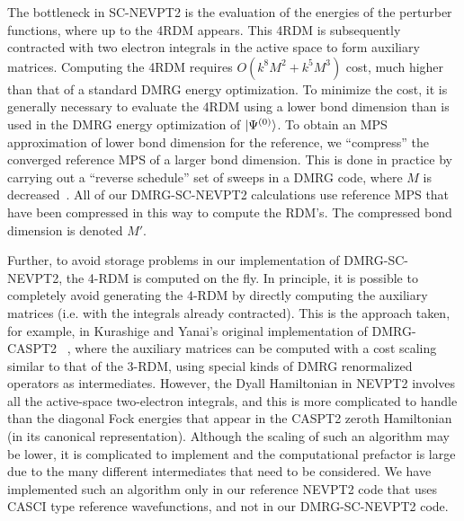 The bottleneck in SC-NEVPT2 is the evaluation of the energies of the perturber functions, 
where up to the 4RDM appears. This 4RDM is subsequently contracted with 
two electron integrals in the active space to form auxiliary matrices.\cite{ angeli_n-electron_2002} 
Computing the 4RDM requires $O(k^8M^2+k^5M^3)$ cost, much higher than that of a standard DMRG energy optimization.
To minimize the cost, it is generally necessary to evaluate the 4RDM using a lower bond dimension than is used in the DMRG energy optimization of $\ket{\Psi^{(0)}}$.
To obtain an MPS approximation of lower bond dimension for the reference, 
we  ``compress'' the converged reference MPS of a larger bond dimension.
 This is done in practice by carrying out a ``reverse schedule'' set of sweeps
in a DMRG code, where $M$ is decreased~\cite{olivares-amaya_ab-initio_2015}. All of our DMRG-SC-NEVPT2 calculations use reference MPS that have been 
compressed in this way to compute the RDM's. The compressed bond dimension is
denoted $M'$.

Further, to avoid storage problems in our implementation of DMRG-SC-NEVPT2, 
the 4-RDM is computed on the fly. In principle, it is possible to 
completely avoid generating the 4-RDM by directly computing the auxiliary matrices (i.e. with the integrals already contracted). 
This is the approach taken, for example, in Kurashige and Yanai's original implementation of DMRG-CASPT2
~\cite{kurashige_second-order_2011}, where the auxiliary matrices can be computed with a cost scaling similar to that of the 3-RDM,
using special kinds of DMRG renormalized operators as intermediates. However, the Dyall Hamiltonian in NEVPT2 
involves all the active-space two-electron integrals, and this is more complicated to handle than the diagonal Fock energies that appear in the CASPT2 zeroth 
Hamiltonian (in its canonical representation). Although the scaling of such an algorithm may be lower, it is complicated to implement
and the computational prefactor is large due to the many different intermediates that need to be considered. We have implemented
such an algorithm only in our reference NEVPT2 code that uses CASCI type reference wavefunctions, and not in our DMRG-SC-NEVPT2 code.





